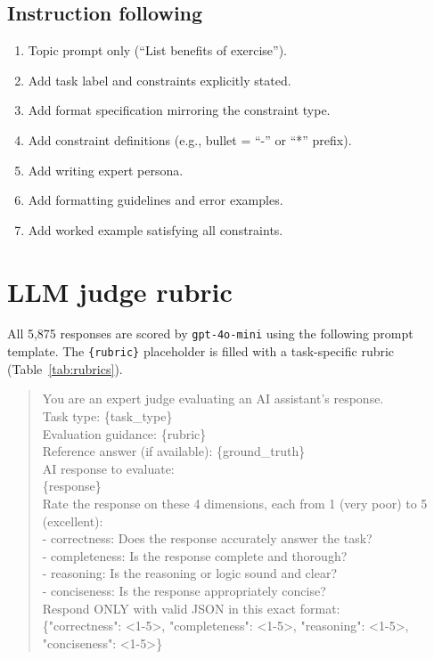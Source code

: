 \subsection{Instruction following}
\begin{enumerate}
  \item Topic prompt only (``List benefits of exercise'').
  \item Add task label and constraints explicitly stated.
  \item Add format specification mirroring the constraint type.
  \item Add constraint definitions (e.g., bullet = ``-'' or ``*'' prefix).
  \item Add writing expert persona.
  \item Add formatting guidelines and error examples.
  \item Add worked example satisfying all constraints.
\end{enumerate}

\section{LLM judge rubric}
\label{app:judge}

All 5,875 responses are scored by \texttt{gpt-4o-mini} using the following
prompt template.
The \texttt{\{rubric\}} placeholder is filled with a task-specific rubric
(Table~\ref{tab:rubrics}).

\begin{quote}
\small
\ttfamily
You are an expert judge evaluating an AI assistant's response.\\[4pt]
Task type: \{task\_type\}\\
Evaluation guidance: \{rubric\}\\
Reference answer (if available): \{ground\_truth\}\\[4pt]
AI response to evaluate:\\
\{response\}\\[4pt]
Rate the response on these 4 dimensions, each from 1 (very poor) to 5
(excellent):\\
- correctness: Does the response accurately answer the task?\\
- completeness: Is the response complete and thorough?\\
- reasoning: Is the reasoning or logic sound and clear?\\
- conciseness: Is the response appropriately concise?\\[4pt]
Respond ONLY with valid JSON in this exact format:\\
\{"correctness": <1-5>, "completeness": <1-5>, "reasoning": <1-5>,
"conciseness": <1-5>\}
\end{quote}

